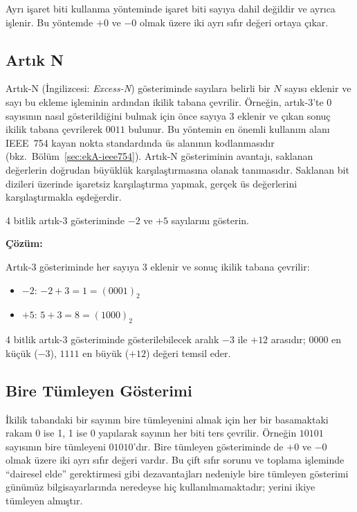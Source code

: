 Ayrı işaret biti kullanma yönteminde işaret biti sayıya dahil değildir ve ayrıca işlenir. Bu yöntemde $+0$ ve $-0$ olmak üzere iki ayrı sıfır değeri ortaya çıkar.

\subsection{Artık N}

Artık-N (İngilizcesi: \textit{Excess-N}) gösteriminde sayılara belirli bir $N$ sayısı eklenir ve sayı bu ekleme işleminin ardından ikilik tabana çevrilir. Örneğin, artık-3'te 0 sayısının nasıl gösterildiğini bulmak için önce sayıya 3 eklenir ve çıkan sonuç ikilik tabana çevrilerek $0011$ bulunur. Bu yöntemin en önemli kullanım alanı IEEE~754 kayan nokta standardında üs alanının kodlanmasıdır (bkz.\ Bölüm~\ref{sec:ekA-ieee754}). Artık-N gösteriminin avantajı, saklanan değerlerin doğrudan büyüklük karşılaştırmasına olanak tanımasıdır. Saklanan bit dizileri üzerinde işaretsiz karşılaştırma yapmak, gerçek üs değerlerini karşılaştırmakla eşdeğerdir.

\begin{ornek}[A.10]
4 bitlik artık-3 gösteriminde $-2$ ve $+5$ sayılarını gösterin.

\textbf{Çözüm:}

Artık-3 gösteriminde her sayıya 3 eklenir ve sonuç ikilik tabana çevrilir:
\begin{itemize}[nosep]
    \item $-2$: \;$-2 + 3 = 1 = (0001)_2$
    \item $+5$: \;$5 + 3 = 8 = (1000)_2$
\end{itemize}
4 bitlik artık-3 gösteriminde gösterilebilecek aralık $-3$ ile $+12$ arasıdır; $0000$ en küçük ($-3$), $1111$ en büyük ($+12$) değeri temsil eder.
\end{ornek}

\subsection{Bire Tümleyen Gösterimi}

İkilik tabandaki bir sayının bire tümleyenini almak için her bir basamaktaki rakam 0 ise 1, 1 ise 0 yapılarak sayının her biti ters çevrilir. Örneğin $10101$ sayısının bire tümleyeni $01010$'dır. Bire tümleyen gösteriminde de $+0$ ve $-0$ olmak üzere iki ayrı sıfır değeri vardır. Bu çift sıfır sorunu ve toplama işleminde ``dairesel elde'' gerektirmesi gibi dezavantajları nedeniyle bire tümleyen gösterimi günümüz bilgisayarlarında neredeyse hiç kullanılmamaktadır; yerini ikiye tümleyen almıştır.

